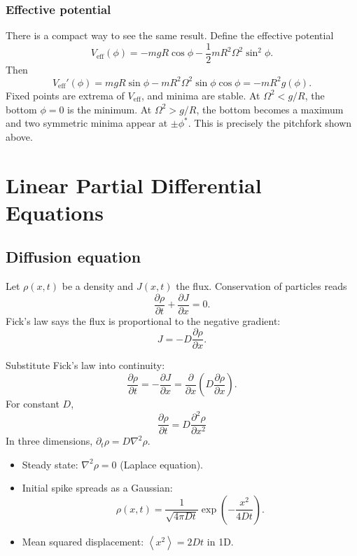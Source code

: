 \documentclass[10.5pt,a4paper]{article}
\newcommand{\avg}[1]{\left\langle #1 \right\rangle}
\begin{document}
\subsubsection*{Effective potential}

There is a compact way to see the same result. Define the effective
potential
\[
V_{\text{eff}}(\phi)
=-mgR\cos\phi-\frac12mR^2\Omega^2\sin^2\phi.
\]
Then
\[
V_{\text{eff}}'(\phi)
=mgR\sin\phi-mR^2\Omega^2\sin\phi\cos\phi
=-mR^2g(\phi).
\]
Fixed points are extrema of \(V_{\text{eff}}\), and minima are stable.
At \(\Omega^2<g/R\), the bottom \(\phi=0\) is the minimum. At
\(\Omega^2>g/R\), the bottom becomes a maximum and two symmetric minima
appear at \(\pm\phi^*\). This is precisely the pitchfork shown above.

\clearpage
{}
\section{Linear Partial Differential Equations}

\subsection{Diffusion equation}

Let \(\rho(x,t)\) be a density and \(J(x,t)\) the flux. Conservation of
particles reads
\[
\frac{\partial\rho}{\partial t}+\frac{\partial J}{\partial x}=0.
\]
Fick's law says the flux is proportional to the negative gradient:
\[
J=-D\frac{\partial\rho}{\partial x}.
\]

\begin{derivbox}
Substitute Fick's law into continuity:
\[
\frac{\partial\rho}{\partial t}
=-\frac{\partial J}{\partial x}
=\frac{\partial}{\partial x}
\left(D\frac{\partial\rho}{\partial x}\right).
\]
For constant \(D\),
\[
\boxed{\;\frac{\partial\rho}{\partial t}
=D\frac{\partial^2\rho}{\partial x^2}\;}
\]
In three dimensions,
\(\partial_t\rho=D\nabla^2\rho\).
\end{derivbox}

\begin{keybox}
\begin{itemize}
\item Steady state: \(\nabla^2\rho=0\) (Laplace equation).
\item Initial spike spreads as a Gaussian:
\[
\rho(x,t)=\frac{1}{\sqrt{4\pi Dt}}
\exp\!\left(-\frac{x^2}{4Dt}\right).
\]
\item Mean squared displacement: \(\avg{x^2}=2Dt\) in 1D.
\end{itemize}
\end{keybox}
\end{document}

